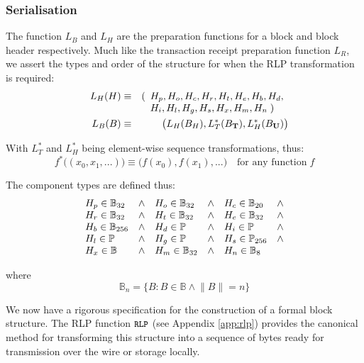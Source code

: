 \documentclass[9pt,oneside]{amsart}
\begin{document}
\begin{multicols}{2}
\subsubsection{Serialisation}

The function $L_B$ and $L_H$ are the preparation functions for a block and block header respectively. Much like the transaction receipt preparation function $L_R$, we assert the types and order of the structure for when the RLP transformation is required:
\begin{eqnarray}
\quad L_H(H) & \equiv & (\begin{array}[t]{l}H_p, H_o, H_c, H_r, H_t, H_e, H_b, H_d,\\ H_i, H_l, H_g, H_s, H_x, H_m, H_n \; )\end{array} \\
\quad L_B(B) & \equiv & \big( L_H(B_H), L_T^*(B_\mathbf{T}), L_H^*(B_\mathbf{U}) \big)
\end{eqnarray}

With $L_T^*$ and $L_H^*$ being element-wise sequence transformations, thus:
\begin{equation}
f^*\big( (x_0, x_1, ...) \big) \equiv \big( f(x_0), f(x_1), ... \big) \quad \text{for any function} \; f
\end{equation}

The component types are defined thus:
\begin{equation}
\begin{array}[t]{lclclcl}
H_p \in \mathbb{B}_{32} & \wedge & H_o \in \mathbb{B}_{32} & \wedge & H_c \in \mathbb{B}_{20} & \wedge \\
H_r \in \mathbb{B}_{32} & \wedge & H_t \in \mathbb{B}_{32} & \wedge & H_e \in \mathbb{B}_{32} & \wedge \\
H_b \in \mathbb{B}_{256} & \wedge & H_d \in \mathbb{P} & \wedge & H_i \in \mathbb{P} & \wedge \\
H_l \in \mathbb{P} & \wedge & H_g \in \mathbb{P} & \wedge & H_s \in \mathbb{P}_{256} & \wedge \\
H_x \in \mathbb{B} & \wedge & H_m \in \mathbb{B}_{32} & \wedge & H_n \in \mathbb{B}_{8}
\end{array}
\end{equation}

where
\begin{equation}
\mathbb{B}_n = \{ B: B \in \mathbb{B} \wedge \lVert B \rVert = n \}
\end{equation}

We now have a rigorous specification for the construction of a formal block structure. The RLP function $\texttt{\small RLP}$ (see Appendix \ref{app:rlp}) provides the canonical method for transforming this structure into a sequence of bytes ready for transmission over the wire or storage locally.


\end{multicols}
\end{document}

